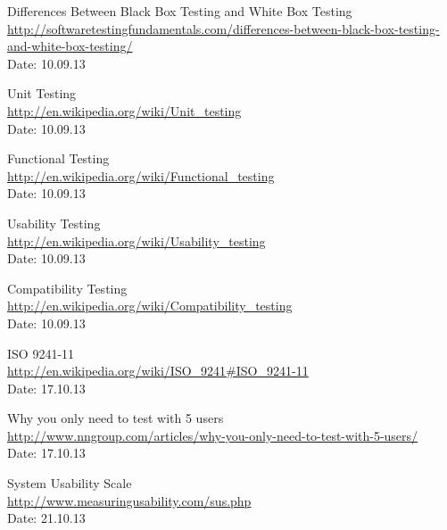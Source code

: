 \begin{thebibliography}{99}

	Differences Between Black Box Testing and White Box Testing \\
	\href {http://softwaretestingfundamentals.com/differences-between-black-box-testing-and-white-box-testing/}{http://softwaretestingfundamentals.com/differences-between-black-box-testing-and-white-box-testing/} \\
	Date: 10.09.13

	Unit Testing \\
	\href {http://en.wikipedia.org/wiki/Unit_testing}{http://en.wikipedia.org/wiki/Unit\_testing} \\
	Date: 10.09.13

	Functional Testing \\
	\href {http://en.wikipedia.org/wiki/Functional_testing}{http://en.wikipedia.org/wiki/Functional\_testing} \\
	Date: 10.09.13

	Usability Testing \\
	\href {http://en.wikipedia.org/wiki/Usability_testing}{http://en.wikipedia.org/wiki/Usability\_testing} \\
	Date: 10.09.13

	Compatibility Testing \\
	\href {http://en.wikipedia.org/wiki/Compatibility_testing}{http://en.wikipedia.org/wiki/Compatibility\_testing} \\
	Date: 10.09.13

	ISO 9241-11 \\
	\href {http://en.wikipedia.org/wiki/ISO_9241#ISO_9241-11}{http://en.wikipedia.org/wiki/ISO\_9241\#ISO\_9241-11} \\
	Date: 17.10.13

	Why you only need to test with 5 users \\
	\href {http://www.nngroup.com/articles/why-you-only-need-to-test-with-5-users/}{http://www.nngroup.com/articles/why-you-only-need-to-test-with-5-users/} \\
	Date: 17.10.13

	System Usability Scale \\
	\href {http://www.measuringusability.com/sus.php}{http://www.measuringusability.com/sus.php} \\
	Date: 21.10.13 


\end{thebibliography}
